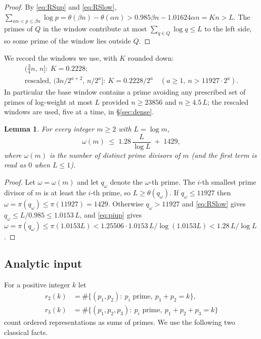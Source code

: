 \documentclass[11pt]{amsart}
\numberwithin{equation}{section}
\newtheorem{lemma}[theorem]{Lemma}
\theoremstyle{remark}
\begin{document}
\begin{proof}
By \eqref{eq:RSup} and \eqref{eq:RSlow},
$\sum_{\alpha n<p\le\beta n}\log p=\theta(\beta n)-\theta(\alpha n)
> 0.985\beta n-1.01624\alpha n=Kn>L$. The primes of $Q$ in the window contribute
at most $\sum_{q\in Q}\log q\le L$ to the left side, so some prime of the window
lies outside $Q$.
\end{proof}

We record the windows we use, with $K$ rounded down:
\begin{equation}\label{eq:windows}
\begin{gathered}
(\tfrac34 n,\,n]:\ K=0.2228;\\
\text{rescaled, } (3n/2^{a+2},\,n/2^a]:\ K=0.2228/2^a
\quad(a\ge1,\ n>11927\cdot2^a).
\end{gathered}
\end{equation}
In particular the base window contains a prime avoiding any prescribed set of
primes of log-weight at most $L$ provided $n\ge 23856$ and $n\ge 4.5\,L$; the
rescaled windows are used, five at a time, in \S\ref{sec:dense}.

\begin{lemma}\label{lem:omega}
For every integer $m\ge 2$ with $L=\log m$,
\[
\omega(m)\;\le\;1.28\,\frac{L}{\log L}\;+\;1429 ,
\]
where $\omega(m)$ is the number of distinct prime divisors of $m$ (and the first
term is read as $0$ when $L\le 1$).
\end{lemma}

\begin{proof}
Let $\omega=\omega(m)$ and let $q_\omega$ denote the $\omega$-th prime. The $i$-th
smallest prime divisor of $m$ is at least the $i$-th prime, so
$L\ge\theta(q_\omega)$. If $q_\omega\le11927$ then
$\omega=\pi(q_\omega)\le\pi(11927)=1429$. Otherwise $q_\omega>11927$ and
\eqref{eq:RSlow} gives
$q_\omega\le L/0.985\le 1.0153\,L$, and \eqref{eq:piup} gives
$\omega=\pi(q_\omega)\le\pi(1.0153L)<1.25506\cdot
1.0153\,L/\log(1.0153L)<1.28\,L/\log L$.
\end{proof}

\subsection{Analytic input}
For a positive integer $k$ let
\begin{align*}
r_2(k)&=\#\{(p_1,p_2):\ p_i \text{ prime},\ p_1+p_2=k\},\\
r_3(k)&=\#\{(p_1,p_2,p_3):\ p_i \text{ prime},\ p_1+p_2+p_3=k\}
\end{align*}
count ordered representations as sums of primes. We use the following two
classical facts.
\end{document}
